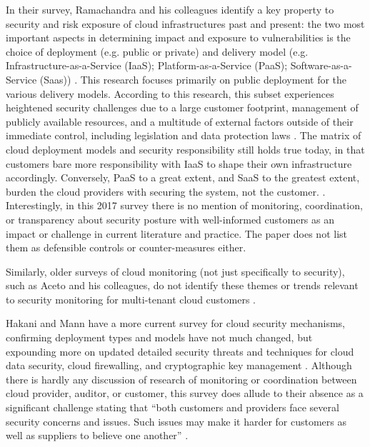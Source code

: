\documentclass{jdf}
\begin{document}
In their survey, Ramachandra and his colleagues identify a key property to security and risk exposure of cloud infrastructures past and present: the two most important aspects in determining impact and exposure to vulnerabilities is the choice of deployment (e.g. public or private) and delivery model (e.g. Infrastructure-as-a-Service (IaaS); Platform-as-a-Service (PaaS); Software-as-a-Service (Saas)) \citeyear[p.~468]{ramachandra17}. This research focuses primarily on public deployment for the various delivery models. According to this research, this subset experiences heightened security challenges due to a large customer footprint, management of publicly available resources, and a multitude of external factors outside of their immediate control, including legislation and data protection laws \cite[p.468]{ramachandra17}. The matrix of cloud deployment models and security responsibility still holds true today, in that customers bare more responsibility with IaaS to shape their own infrastructure accordingly. Conversely, PaaS to a great extent, and SaaS to the greatest extent, burden the cloud providers with securing the system, not the customer. \cite[p.~469]{ramachandra17}. Interestingly, in this 2017 survey there is no mention of monitoring, coordination, or transparency about security posture with well-informed customers as an impact or challenge in current literature and practice. The paper does not list them as defensible controls or counter-measures either.

Similarly, older surveys of cloud monitoring (not just specifically to security), such as Aceto and his colleagues, do not identify these themes or trends relevant to security monitoring for multi-tenant cloud customers \citeyear{aceto13}.

Hakani and Mann have a more current survey for cloud security mechanisms, confirming deployment types and models have not much changed, but expounding more on updated detailed security threats and techniques for cloud data security, cloud firewalling, and cryptographic key management \citeyear{hakani22}. Although there is hardly any discussion of research of monitoring or coordination between cloud provider, auditor, or customer, this survey does allude to their absence as a significant challenge stating that ``both customers and providers face several security concerns and issues. Such issues may make it harder for customers as well as suppliers to believe one another'' \citeyear[p.~475]{hakani22}.
\end{document}
